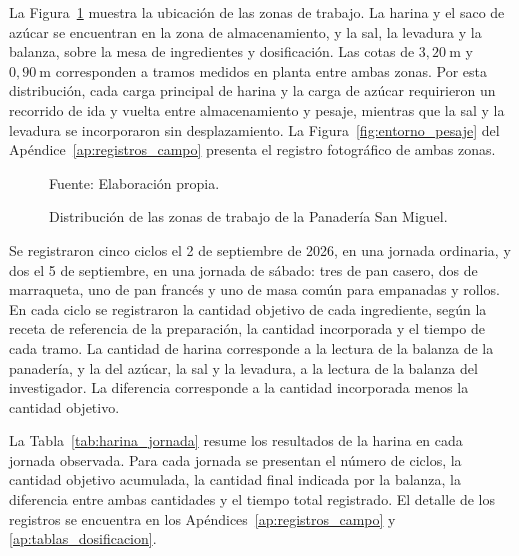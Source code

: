 La Figura~\ref{fig:croquis_panaderia} muestra la ubicación de las zonas de
trabajo. La harina y el saco de azúcar se encuentran en la zona de
almacenamiento, y la sal, la levadura y la balanza, sobre la mesa de
ingredientes y dosificación. Las cotas de $3{,}20\ \mathrm{m}$ y
$0{,}90\ \mathrm{m}$ corresponden a tramos medidos en planta entre ambas
zonas. Por esta distribución, cada carga principal de harina y la carga de
azúcar requirieron un recorrido de ida y vuelta entre almacenamiento y
pesaje, mientras que la sal y la levadura se incorporaron sin
desplazamiento. La Figura~\ref{fig:entorno_pesaje} del
Apéndice~\ref{ap:registros_campo} presenta el registro fotográfico de
ambas zonas.

\begin{figure}[H]
    \centering
    \resizebox{0.9\textwidth}{!}{%
    }
    \caption{Distribución de las zonas de trabajo de la Panadería San Miguel.}
    \label{fig:croquis_panaderia}
    \vspace{0.2em}
    {\footnotesize Fuente: Elaboración propia.}
\end{figure}


Se registraron cinco ciclos el 2 de septiembre de 2026, en una jornada
ordinaria, y dos el 5 de septiembre, en una jornada de sábado: tres de pan
casero, dos de marraqueta, uno de pan francés y uno de masa común para
empanadas y rollos. En cada ciclo se registraron la cantidad objetivo de
cada ingrediente, según la receta de referencia de la preparación, la
cantidad incorporada y el tiempo de cada tramo. La cantidad de harina
corresponde a la lectura de la balanza de la panadería, y la del azúcar,
la sal y la levadura, a la lectura de la balanza del investigador.
La diferencia corresponde a la cantidad incorporada menos la cantidad
objetivo.

La Tabla~\ref{tab:harina_jornada} resume los resultados de la harina en
cada jornada observada. Para cada jornada se presentan el número de
ciclos, la cantidad objetivo acumulada, la cantidad final indicada por la
balanza, la diferencia entre ambas cantidades y el tiempo total
registrado. El detalle de los registros se encuentra en los
Apéndices~\ref{ap:registros_campo} y \ref{ap:tablas_dosificacion}.

